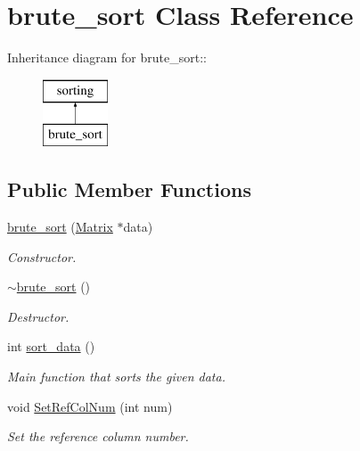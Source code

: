 \hypertarget{classbrute__sort}{
\section{brute\_\-sort Class Reference}
\label{d3/d39/classbrute__sort}
}
Inheritance diagram for brute\_\-sort::\begin{figure}[H]
\begin{center}
\leavevmode
\includegraphics[height=2cm]{d3/d39/classbrute__sort}
\end{center}
\end{figure}
\subsection*{Public Member Functions}
\begin{DoxyCompactItemize}
\item 
\hyperlink{classbrute__sort_a2dbbb3b1c89d6a5720d79a5bf150ad1f}{brute\_\-sort} (\hyperlink{classMatrix}{Matrix} $\ast$data)
\begin{DoxyCompactList}\small\item\em Constructor. \item\end{DoxyCompactList}\item 
\hypertarget{classbrute__sort_a0c5f47456d59d36d8b2370196d953b81}{
\hyperlink{classbrute__sort_a0c5f47456d59d36d8b2370196d953b81}{$\sim$brute\_\-sort} ()}
\label{d3/d39/classbrute__sort_a0c5f47456d59d36d8b2370196d953b81}

\begin{DoxyCompactList}\small\item\em Destructor. \item\end{DoxyCompactList}\item 
int \hyperlink{classbrute__sort_a377b8811e92553a66cdb6780c43e16e6}{sort\_\-data} ()
\begin{DoxyCompactList}\small\item\em Main function that sorts the given data. \item\end{DoxyCompactList}\item 
\hypertarget{classbrute__sort_a7d43275af73d67695f2736dcada07b86}{
void \hyperlink{classbrute__sort_a7d43275af73d67695f2736dcada07b86}{SetRefColNum} (int num)}
\label{d3/d39/classbrute__sort_a7d43275af73d67695f2736dcada07b86}

\begin{DoxyCompactList}\small\item\em Set the reference column number. \item\end{DoxyCompactList}\end{DoxyCompactItemize}


